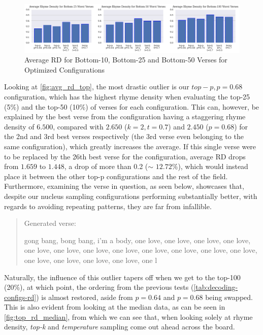 \begin{figure}[ht!]
    \includegraphics[height=\textheight, width=\textwidth, keepaspectratio=true]{figures/bot_verse_rd.png}
    \caption{Average RD for Bottom-10, Bottom-25 and Bottom-50 Verses for Optimized Configurations}
    \label{fig:avg_rd_bottom}
\end{figure}

Looking at \cref{fig:avg_rd_top}, the most drastic outlier is our $top-p, p=0.68$ configuration, which has the highest rhyme density when evaluating the top-25 (5\%) and the top-50 (10\%) of verses for each configuration. This can, however, be explained by the best verse from the configuration having a staggering rhyme density of $6.500$, compared with $2.650$ ($k=2, t=0.7$) and $2.450$ ($p=0.68$) for the 2nd and 3rd best verses respectively (the 3rd verse even belonging to the same configuration), which greatly increases the average. If this single verse were to be replaced by the 26th best verse for the configuration, average RD drops from $1.659$ to $1.448$, a drop of more than 0.2 ($\sim$ $12.72\%$), which would instead place it between the other top-p configurations and the rest of the field. Furthermore, examining the verse in question, as seen below, showcases that, despite our nucleus sampling configurations performing substantially better, with regards to avoiding repeating patterns, they are far from infallible.

\begin{quote}
\begin{em}
    Generated verse:
    
    gong bang, bong bang, i'm a body, one love, one love, one love, one love, one love, one love, one love, one love, one love, one love, one love, one love, one love, one love, one love, one love, one l
\end{em}
\end{quote}


Naturally, the influence of this outlier tapers off when we get to the top-100 (20\%), at which point, the ordering from the previous tests (\cref{tab:decoding-configs-rd}) is almost restored, aside from $p=0.64$ and $p=0.68$ being swapped. This is also evident from looking at the median data, as can be seen in \cref{fig:top_rd_median}, from which we can see that, when looking solely at rhyme density, \textit{top-k} and \textit{temperature} sampling come out ahead across the board.

